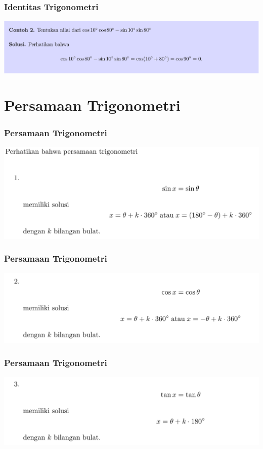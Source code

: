 \documentclass[pdflatex,compress,mathserif]{beamer}
\begin{document}
\begin{frame}
	\frametitle{Identitas Trigonometri}
	\begin{center}
		\includegraphics[width=\linewidth]{img/img16}
	\end{center}
\end{frame}

\section{Persamaan Trigonometri}

\begin{frame}
	\frametitle{Persamaan Trigonometri}
	\begin{center}
		\includegraphics[width=\linewidth]{img/img17}
	\end{center}
\end{frame}

\begin{frame}
	\frametitle{Persamaan Trigonometri}
	\begin{center}
		\includegraphics[width=\linewidth]{img/img18}
	\end{center}
\end{frame}

\begin{frame}
	\frametitle{Persamaan Trigonometri}
	\begin{center}
		\includegraphics[width=\linewidth]{img/img19}
	\end{center}
\end{frame}
\end{document}

